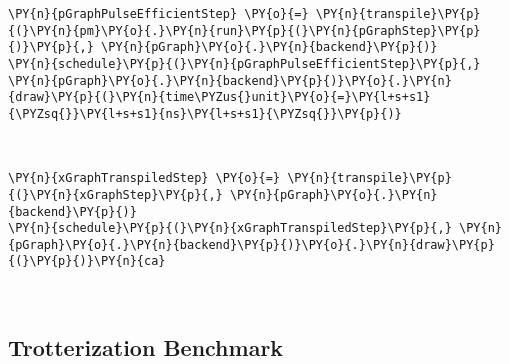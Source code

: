     \begin{tcolorbox}[breakable, size=fbox, boxrule=1pt, pad at break*=1mm,colback=cellbackground, colframe=cellborder]
\begin{Verbatim}[commandchars=\\\{\}]
\PY{n}{pGraphPulseEfficientStep} \PY{o}{=} \PY{n}{transpile}\PY{p}{(}\PY{n}{pm}\PY{o}{.}\PY{n}{run}\PY{p}{(}\PY{n}{pGraphStep}\PY{p}{)}\PY{p}{,} \PY{n}{pGraph}\PY{o}{.}\PY{n}{backend}\PY{p}{)}
\PY{n}{schedule}\PY{p}{(}\PY{n}{pGraphPulseEfficientStep}\PY{p}{,} \PY{n}{pGraph}\PY{o}{.}\PY{n}{backend}\PY{p}{)}\PY{o}{.}\PY{n}{draw}\PY{p}{(}\PY{n}{time\PYZus{}unit}\PY{o}{=}\PY{l+s+s1}{\PYZsq{}}\PY{l+s+s1}{ns}\PY{l+s+s1}{\PYZsq{}}\PY{p}{)}
\end{Verbatim}
\end{tcolorbox}
 
            
    
    \begin{center}
    \end{center}
    { \hspace*{\fill} \\}
    

    \begin{tcolorbox}[breakable, size=fbox, boxrule=1pt, pad at break*=1mm,colback=cellbackground, colframe=cellborder]
\begin{Verbatim}[commandchars=\\\{\}]
\PY{n}{xGraphTranspiledStep} \PY{o}{=} \PY{n}{transpile}\PY{p}{(}\PY{n}{xGraphStep}\PY{p}{,} \PY{n}{pGraph}\PY{o}{.}\PY{n}{backend}\PY{p}{)}
\PY{n}{schedule}\PY{p}{(}\PY{n}{xGraphTranspiledStep}\PY{p}{,} \PY{n}{pGraph}\PY{o}{.}\PY{n}{backend}\PY{p}{)}\PY{o}{.}\PY{n}{draw}\PY{p}{(}\PY{p}{)}\PY{n}{ca}
\end{Verbatim}
\end{tcolorbox}
 
            
    
    \begin{center}
    \end{center}
    { \hspace*{\fill} \\}
    

    \hypertarget{trotterization-benchmark}{%
\subsection{Trotterization Benchmark}\label{trotterization-benchmark}}

